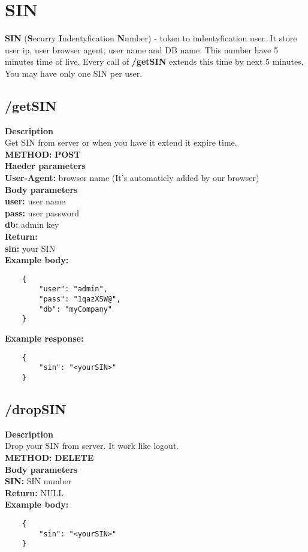 \documentclass[a4paper, 12pt]{report}
\begin{document}
\section{SIN}
\textbf{SIN} (\textbf{S}ecurry \textbf{I}ndentyfication \textbf{N}umber) - token to indentyfication user. It store user ip, user browser agent, user name and DB name.
This number have 5 minutes time of live. Every call of \textbf{/getSIN} extends this time by next 5 minutes.
You may have only one SIN per user.
\subsection{/getSIN}
\textbf{\color{redText} Description} \\
Get SIN from server or when you have it extend it expire time. \\
\textbf{\color{redText} METHOD: } \textbf{POST} \\
\textbf{\color{redText} Haeder parameters} \\
\textbf{User-Agent: } browser name (It's automaticly added by our browser)\\
\textbf{\color{redText} Body parameters} \\
\textbf{user: } user name\\
\textbf{pass: } user password\\
\textbf{db: } admin key \\
\textbf{\color{redText} Return: }\\
\textbf{sin: } your SIN \\
\textbf{\color{redText} Example body: }
\begin{lstlisting}
    {
        "user": "admin",
        "pass": "1qazXSW@",
        "db": "myCompany"
    }
\end{lstlisting}
\textbf{\color{redText} Example response: }
\begin{lstlisting}
    {
        "sin": "<yourSIN>"
    }
\end{lstlisting}

\subsection{/dropSIN}
\textbf{\color{redText} Description} \\
Drop your SIN from server. It work like logout. \\
\textbf{\color{redText} METHOD: } \textbf{DELETE} \\
\textbf{\color{redText} Body parameters} \\
\textbf{SIN: } SIN number\\
\textbf{\color{redText} Return: } NULL \\
\textbf{\color{redText} Example body: }
\begin{lstlisting}
    {
        "sin": "<yourSIN>"
    }
\end{lstlisting}
\end{document}
